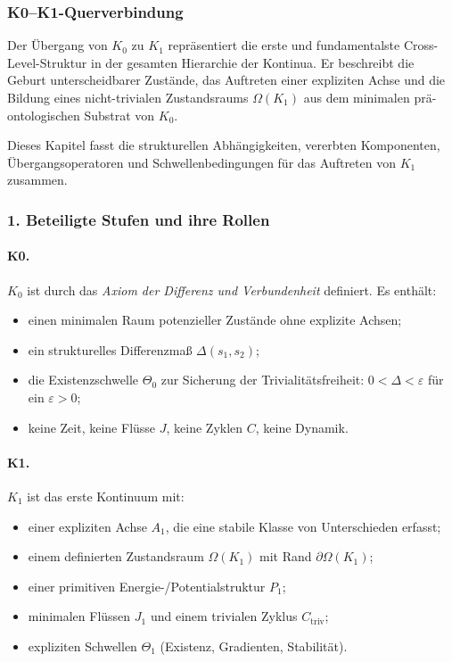 
\subsubsection{K0–K1-Querverbindung}
\label{sec:crossk-k0-k1}

Der Übergang von $K_0$ zu $K_1$ repräsentiert die erste und fundamentalste
Cross-Level-Struktur in der gesamten Hierarchie der Kontinua. Er beschreibt die
Geburt unterscheidbarer Zustände, das Auftreten einer expliziten Achse und die
Bildung eines nicht-trivialen Zustandsraums $\Omega(K_1)$ aus dem minimalen
prä-ontologischen Substrat von $K_0$.

Dieses Kapitel fasst die strukturellen Abhängigkeiten, vererbten Komponenten,
Übergangsoperatoren und Schwellenbedingungen für das Auftreten von $K_1$ zusammen.

\subsubsection{1. Beteiligte Stufen und ihre Rollen}

\paragraph{K0.}
$K_0$ ist durch das \emph{Axiom der Differenz und Verbundenheit} definiert.
Es enthält:
\begin{itemize}
  \item einen minimalen Raum potenzieller Zustände ohne explizite Achsen;
  \item ein strukturelles Differenzmaß $\Delta(s_1,s_2)$;
  \item die Existenzschwelle $\Theta_0$ zur Sicherung der Trivialitätsfreiheit:
        $0 < \Delta < \varepsilon$ für ein $\varepsilon>0$;
  \item keine Zeit, keine Flüsse $J$, keine Zyklen $C$, keine Dynamik.
\end{itemize}

\paragraph{K1.}
$K_1$ ist das erste Kontinuum mit:
\begin{itemize}
  \item einer expliziten Achse $A_1$, die eine stabile Klasse von Unterschieden
        erfasst;
  \item einem definierten Zustandsraum $\Omega(K_1)$ mit Rand
        $\partial\Omega(K_1)$;
  \item einer primitiven Energie-/Potentialstruktur $P_1$;
  \item minimalen Flüssen $J_1$ und einem trivialen Zyklus
        $C_{\mathrm{triv}}$;
  \item expliziten Schwellen $\Theta_1$ (Existenz, Gradienten, Stabilität).
\end{itemize}

